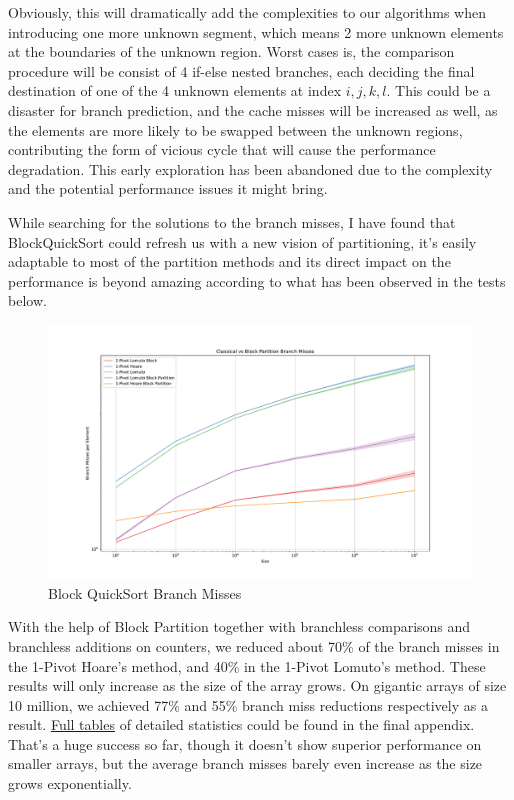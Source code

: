 \documentclass{article}
\begin{document}
Obviously, this will dramatically add the complexities to our algorithms when introducing one more unknown segment, which means 2 more unknown elements at the boundaries of the unknown region. Worst cases is, the comparison procedure will be consist of 4 if-else nested branches, each deciding the final destination of one of the 4 unknown elements at index $i, j, k, l$.
This could be a disaster for branch prediction, and the cache misses will be increased as well, as the elements are more likely to be swapped between the unknown regions, contributing the form of vicious cycle that will cause the performance degradation. This early exploration has been abandoned due to the complexity and the potential performance issues it might bring.

While searching for the solutions to the branch misses, I have found that BlockQuickSort could refresh us with a new vision of partitioning, it's easily adaptable to most of the partition methods and its direct impact on the performance is beyond amazing
according to what has been observed in the tests below.

\begin{figure}[H]
    \hypertarget{fig:blockbranchmiss}{}
    \caption{Block QuickSort Branch Misses}
    \centering
    \hspace*{-0.27\textwidth}
    \includegraphics[width=1.5\textwidth]{Classical vs Block Partition Branch Misses.pdf}
\end{figure}

With the help of Block Partition together with branchless comparisons and branchless additions on counters, we reduced about 70\% of the branch misses in the 1-Pivot Hoare's method, and 40\% in the 1-Pivot Lomuto's method. These results will only increase as the size of the array grows.
On gigantic arrays of size 10 million, we achieved 77\% and 55\% branch miss reductions respectively as a result. \hyperlink{FullTables}{Full tables} of detailed statistics could be found in the final appendix. That's a huge success so far, though it doesn't show superior performance on smaller arrays, but the average branch misses barely even increase as the size grows exponentially.
\end{document}
